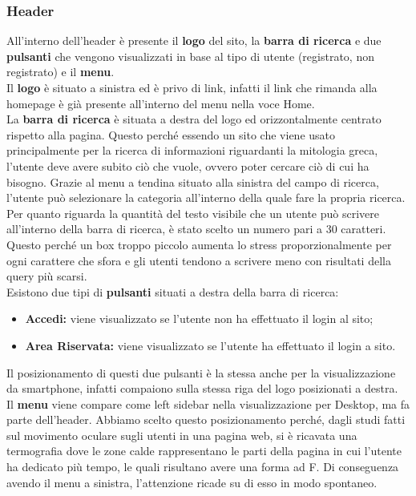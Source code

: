\subsubsection{Header}
All'interno dell'header è presente il \textbf{logo} del sito, la \textbf{barra di ricerca} e due \textbf{pulsanti} che vengono visualizzati in base al tipo di utente (registrato, non registrato) e il \textbf{menu}.\\
Il \textbf{logo} è situato a sinistra ed è privo di link, infatti il link che rimanda alla homepage è già presente all'interno del menu nella voce Home.\\
La \textbf{barra di ricerca} è situata a destra del logo ed orizzontalmente centrato rispetto alla pagina. Questo perché essendo un sito che viene usato principalmente per la ricerca di informazioni riguardanti la mitologia greca, l'utente deve avere subito ciò che vuole, ovvero poter cercare ciò di cui ha bisogno. Grazie al menu a tendina situato alla sinistra del campo di ricerca, l'utente può selezionare la categoria all'interno della quale fare la propria ricerca.\\
Per quanto riguarda la quantità del testo visibile che un utente può scrivere all'interno della barra di ricerca, è stato scelto un numero pari a 30 caratteri. Questo perché un box troppo piccolo aumenta lo stress proporzionalmente per ogni carattere che sfora e gli utenti tendono a scrivere meno con risultati della query più scarsi.\\
Esistono due tipi di \textbf{pulsanti} situati a destra della barra di ricerca:
\begin{itemize}
	\item \textbf{Accedi:} viene visualizzato se l'utente non ha effettuato il login al sito;
	\item \textbf{Area Riservata:} viene visualizzato se l'utente ha effettuato il login a sito.
\end{itemize}
Il posizionamento di questi due pulsanti è la stessa anche per la visualizzazione da smartphone, infatti compaiono sulla stessa riga del logo posizionati a destra.\\
Il \textbf{menu} viene compare come left sidebar nella visualizzazione per Desktop, ma fa parte dell'header. Abbiamo scelto questo posizionamento perché, dagli studi fatti sul movimento oculare sugli utenti in una pagina web, si è ricavata una termografia dove le zone calde rappresentano le parti della pagina in cui l'utente ha dedicato più tempo, le quali risultano avere una forma ad F. Di conseguenza avendo il menu a sinistra, l'attenzione ricade su di esso in modo spontaneo.\\

